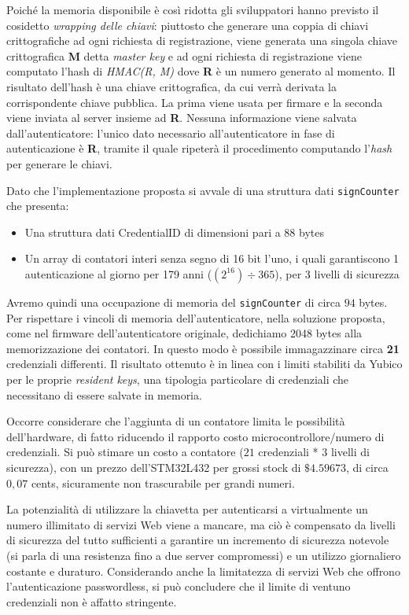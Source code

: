 Poiché la memoria disponibile è così ridotta gli sviluppatori hanno previsto il cosidetto \emph{wrapping delle chiavi}: piuttosto che generare una coppia di chiavi crittografiche ad ogni richiesta di registrazione, viene generata una singola chiave crittografica \textbf{M} detta \emph{master key} e ad ogni richiesta di registrazione viene computato l'hash di \emph{HMAC(R, M)} dove \textbf{R} è un numero generato al momento. Il risultato dell'hash è una chiave crittografica, da cui verrà derivata la corrispondente chiave pubblica. La prima viene usata per firmare e la seconda viene inviata al server insieme ad \textbf{R}. Nessuna informazione viene salvata dall'autenticatore: l'unico dato necessario all'autenticatore in fase di autenticazione è \textbf{R}, tramite il quale ripeterà il procedimento computando l'\emph{hash} per generare le chiavi. 

Dato che l'implementazione proposta si avvale di una struttura dati \verb*|signCounter| che presenta:
\begin{itemize}
	\item Una struttura dati CredentialID di dimensioni pari a $88$ bytes
	\item Un array di contatori interi senza segno di 16 bit l'uno, i quali garantiscono 1 autenticazione al giorno per 179 anni ($(2^{16}) \div 365$), per 3 livelli di sicurezza
\end{itemize}


Avremo quindi una occupazione di memoria del \verb*|signCounter| di circa $94$ bytes. Per rispettare i vincoli di memoria dell'autenticatore, nella soluzione proposta, come nel firmware dell'autenticatore originale, dedichiamo 2048 bytes alla memorizzazione dei contatori. In questo modo è possibile immagazzinare circa \textbf{21} credenziali differenti. Il risultato ottenuto è in linea con i limiti stabiliti \cite{yubico:resident} da Yubico per le proprie \emph{resident keys}, una tipologia particolare di credenziali che necessitano di essere salvate in memoria.

Occorre considerare che l'aggiunta di un contatore limita le possibilità dell'hardware, di fatto riducendo il rapporto costo microcontrollore/numero di credenziali. Si può stimare un costo a contatore ($21$ credenziali * $ 3$ livelli di sicurezza), con un prezzo dell'STM32L432 per grossi stock di $\$4.59673$, di circa $0,07$ cents, sicuramente non trascurabile per grandi numeri.

La potenzialità di utilizzare la chiavetta per autenticarsi a virtualmente un numero illimitato di servizi Web viene a mancare, ma ciò è compensato da livelli di sicurezza del tutto sufficienti a garantire un incremento di sicurezza notevole (si parla di una resistenza fino a due server compromessi) e un utilizzo giornaliero costante e duraturo. Considerando anche la limitatezza di servizi Web che offrono l'autenticazione passwordless, si può concludere che il limite di ventuno credenziali non è affatto stringente. 